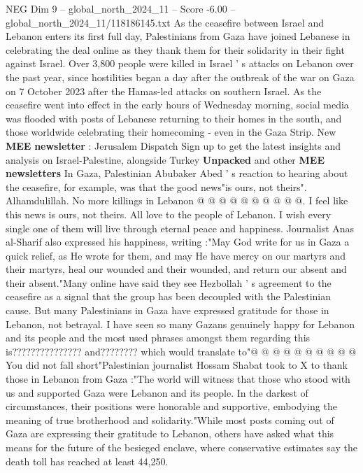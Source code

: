 \begin{textsample}{NEG Dim 9 – global\_north\_2024\_11 – Score -6.00 – global\_north\_2024\_11/118186145.txt}  \label{ex:f9_neg_054}
As the ceasefire between Israel and Lebanon enters its first full day, Palestinians from Gaza have joined Lebanese in celebrating the deal online as they thank them for their solidarity in their fight against Israel.
Over 3,800 people were killed in Israel ' s attacks on Lebanon over the past year, since hostilities began a day after the outbreak of the war on Gaza on 7 October 2023 after the Hamas-led attacks on southern Israel.
As the ceasefire went into effect in the early hours of Wednesday morning, social media was flooded with posts of Lebanese returning to their homes in the south, and those worldwide celebrating their homecoming - even in the Gaza Strip.
New \textbf{MEE} \textbf{newsletter} : Jerusalem Dispatch Sign up to get the latest insights and analysis on Israel-Palestine, alongside Turkey \textbf{Unpacked} and other \textbf{MEE} \textbf{newsletters} In Gaza, Palestinian Abubaker Abed ' s reaction to hearing about the ceasefire, for example, was that the good news"is ours, not theirs".
Alhamdulillah.
No more killings in Lebanon @ @ @ @ @ @ @ @ @ @.
I feel like this news is ours, not theirs.
All love to the people of Lebanon.
I wish every single one of them will live through eternal peace and happiness.
Journalist Anas al-Sharif also expressed his happiness, writing :"May God write for us in Gaza a quick relief, as He wrote for them, and may He have mercy on our martyrs and their martyrs, heal our wounded and their wounded, and return our absent and their absent."Many online have said they see Hezbollah ' s agreement to the ceasefire as a signal that the group has been decoupled with the Palestinian cause.
But many Palestinians in Gaza have expressed gratitude for those in Lebanon, not betrayal.
I have seen so many Gazans genuinely happy for Lebanon and its people and the most used phrases amongst them regarding this is??????????????? and???????? which would translate to"@ @ @ @ @ @ @ @ @ @ You did not fall short"Palestinian journalist Hossam Shabat took to X to thank those in Lebanon from Gaza :"The world will witness that those who stood with us and supported Gaza were Lebanon and its people.
In the darkest of circumstances, their positions were honorable and supportive, embodying the meaning of true brotherhood and solidarity."While most posts coming out of Gaza are expressing their gratitude to Lebanon, others have asked what this means for the future of the besieged enclave, where conservative estimates say the death toll has reached at least 44,250.

\end{textsample}
